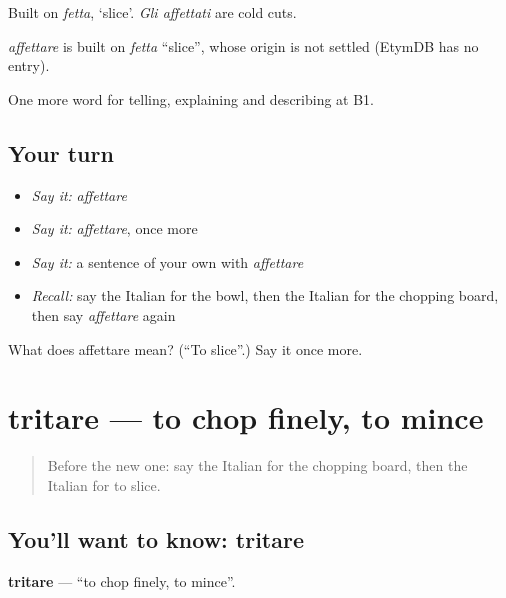 Built on \emph{fetta}, ‘slice’. \emph{Gli affettati} are cold cuts.

\begin{cousinweb}
\emph{affettare} is built on \emph{fetta} \textquotedblleft{}slice\textquotedblright{}, whose origin is not settled (EtymDB has no entry).
\end{cousinweb}

\begin{grammarlens}[title={What you've built}]
One more word for telling, explaining and describing at B1.
\end{grammarlens}

\subsection*{Your turn}
\begin{itemize}
\raggedright
  \item \emph{Say it:} \emph{affettare}
  \item \emph{Say it:} \emph{affettare}, once more
  \item \emph{Say it:} a sentence of your own with \emph{affettare}
  \item \emph{Recall:} say the Italian for the bowl, then the Italian for the chopping board, then say \emph{affettare} again
\end{itemize}

\begin{tcolorbox}[breakable,colback=teal!4,colframe=teal!35!black,title={Before you move on}]
What does affettare mean? (\textquotedblleft{}To slice\textquotedblright{}.) Say it once more.
\end{tcolorbox}
\section[tritare]{tritare — to chop finely, to mince}

\label{lesson:IT-C332-tritare}



\begin{quote}
Before the new one: say the Italian for the chopping board, then the Italian for to slice.
\end{quote}

\subsection*{You'll want to know: tritare}
\textbf{tritare} — \textquotedblleft{}to chop finely, to mince\textquotedblright{}.

